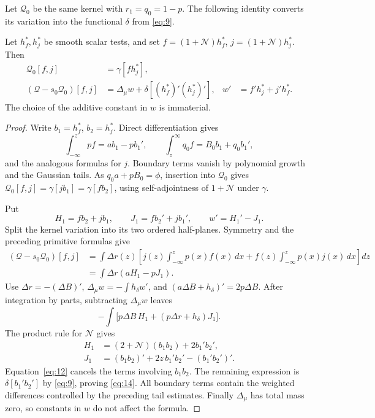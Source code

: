 Let \(\mathcal Q_0\) be the same kernel with \(r_1=q_0=1-p\).
The following identity converts its variation into the functional
\(\delta\) from \eqref{eq:9}.

\begin{lemma}\label{lem:kernel-variation}
 Let \(h_f^*,h_j^*\) be smooth scalar tests, and set
 \(f=(1+\mathcal N)h_f^*\), \(j=(1+\mathcal N)h_j^*\).
 Then
 \begin{equation}\tag{14}\label{eq:14}
 \begin{aligned}
  \mathcal Q_0[f,j]&=\gamma[f h_j^*],\\
  (\mathcal Q-s_0\mathcal Q_0)[f,j]
    &=\Delta_\mu w+\delta[(h_f^*)'(h_j^*)'],&
  w'&=f'h_j^*+j'h_f^* .
 \end{aligned}
 \end{equation}
 The choice of the additive constant in \(w\) is immaterial.
\end{lemma}

\begin{proof}
Write \(b_1=h_f^*\), \(b_2=h_j^*\). Direct differentiation gives
\[
 \int_{-\infty}^z p f=a b_1-p b_1',\qquad
 \int_z^\infty q_0 f=B_0 b_1+q_0 b_1',
\]
and the analogous formulas for \(j\). Boundary terms vanish by
polynomial growth and the Gaussian tails. As
\(q_0a+pB_0=\phi\), insertion into \(\mathcal Q_0\) gives
\(\mathcal Q_0[f,j]=\gamma[jb_1]=\gamma[fb_2]\), using
self-adjointness of \(1+\mathcal N\) under \(\gamma\).

Put
\[
 H_1=fb_2+jb_1,\qquad J_1=fb_2'+jb_1',\qquad w'=H_1'-J_1.
\]
Split the kernel variation into its two ordered half-planes. Symmetry
and the preceding primitive formulas give
\[
 \begin{aligned}
 (\mathcal Q-s_0\mathcal Q_0)[f,j]
 &=\int\Delta r(z)\left[
       j(z)\int_{-\infty}^z p(x)f(x)\,dx
       +f(z)\int_{-\infty}^z p(x)j(x)\,dx\right]dz\\
 &=\int\Delta r(aH_1-pJ_1).
 \end{aligned}
\]
Use \(\Delta r=-(\Delta B)'\),
\(\Delta_\mu w=-\int h_\delta w'\), and
\((a\Delta B+h_\delta)'=2p\Delta B\). After integration by parts,
subtracting \(\Delta_\mu w\) leaves
\[
 -\int\bigl[p\Delta B\,H_1+(p\Delta r+h_\delta)J_1\bigr].
\]
The product rule for \(\mathcal N\) gives
\[
 \begin{aligned}
 H_1&=(2+\mathcal N)(b_1b_2)+2b_1'b_2',\\
 J_1&=(b_1b_2)'+2z\,b_1'b_2'-(b_1'b_2')'.
 \end{aligned}
\]
Equation~\eqref{eq:12} cancels the terms involving \(b_1b_2\).
The remaining expression is
\(\delta[b_1'b_2']\) by \eqref{eq:9}, proving \eqref{eq:14}.
All boundary terms contain the weighted differences controlled by
the preceding tail estimates. Finally \(\Delta_\mu\) has total
mass zero, so constants in \(w\) do not affect the formula.
\end{proof}

